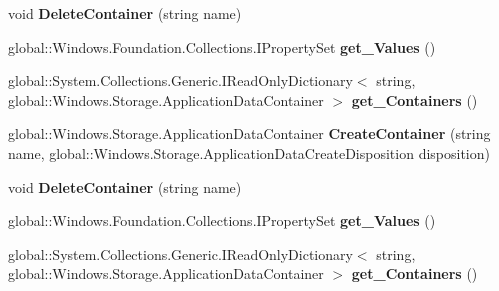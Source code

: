 \begin{DoxyCompactItemize}
\item 
\mbox{\label{interface_windows_1_1_storage_1_1_i_application_data_container_a900abad7d6853503cdd95e3d82cd2867}} 
void {\bfseries Delete\+Container} (string name)
\item 
\mbox{\label{interface_windows_1_1_storage_1_1_i_application_data_container_a6a8a475818330878971aadb509a49dde}} 
global\+::\+Windows.\+Foundation.\+Collections.\+I\+Property\+Set {\bfseries get\+\_\+\+Values} ()
\item 
\mbox{\label{interface_windows_1_1_storage_1_1_i_application_data_container_a08ebbc78fa92d7dcaea9b36261b01f7c}} 
global\+::\+System.\+Collections.\+Generic.\+I\+Read\+Only\+Dictionary$<$ string, global\+::\+Windows.\+Storage.\+Application\+Data\+Container $>$ {\bfseries get\+\_\+\+Containers} ()
\item 
\mbox{\label{interface_windows_1_1_storage_1_1_i_application_data_container_ad3ca0020aa9ff4735e605413e9948f61}} 
global\+::\+Windows.\+Storage.\+Application\+Data\+Container {\bfseries Create\+Container} (string name, global\+::\+Windows.\+Storage.\+Application\+Data\+Create\+Disposition disposition)
\item 
\mbox{\label{interface_windows_1_1_storage_1_1_i_application_data_container_a900abad7d6853503cdd95e3d82cd2867}} 
void {\bfseries Delete\+Container} (string name)
\item 
\mbox{\label{interface_windows_1_1_storage_1_1_i_application_data_container_a6a8a475818330878971aadb509a49dde}} 
global\+::\+Windows.\+Foundation.\+Collections.\+I\+Property\+Set {\bfseries get\+\_\+\+Values} ()
\item 
\mbox{\label{interface_windows_1_1_storage_1_1_i_application_data_container_a08ebbc78fa92d7dcaea9b36261b01f7c}} 
global\+::\+System.\+Collections.\+Generic.\+I\+Read\+Only\+Dictionary$<$ string, global\+::\+Windows.\+Storage.\+Application\+Data\+Container $>$ {\bfseries get\+\_\+\+Containers} ()

\end{DoxyCompactItemize}
